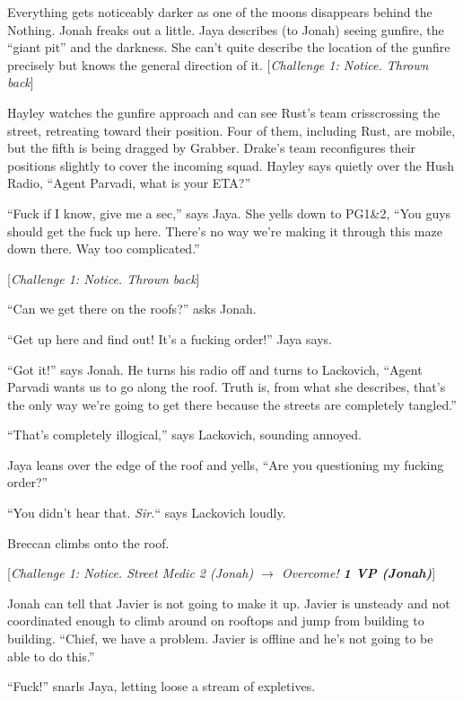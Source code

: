 Everything gets noticeably darker as one of the moons disappears behind the Nothing.  Jonah freaks out a little.  Jaya describes (to Jonah) seeing gunfire, the ``giant pit'' and the darkness.  She can't quite describe the location of the gunfire precisely but knows the general direction of it.  {[}\textit{Challenge 1: Notice.  Thrown back}{]}



Hayley watches the gunfire approach and can see Rust's team crisscrossing the street, retreating toward their position.  Four of them, including Rust, are mobile, but the fifth is being dragged by Grabber.  Drake's team reconfigures their positions slightly to cover the incoming squad.  Hayley says quietly over the Hush Radio, ``Agent Parvadi, what is your ETA?''

``Fuck if I know, give me a sec,'' says Jaya.  She yells down to PG1\&2, ``You guys should get the fuck up here.  There's no way we're making it through this maze down there.  Way too complicated.''

{[}\textit{Challenge 1: Notice.  Thrown back}{]}  

``Can we get there on the roofs?'' asks Jonah.

``Get up here and find out!  It's a fucking order!'' Jaya says.

``Got it!'' says Jonah.  He turns his radio off and turns to Lackovich, ``Agent Parvadi wants us to go along the roof.  Truth is, from what she describes, that's the only way we're going to get there because the streets are completely tangled.''

``That's completely illogical,'' says Lackovich, sounding annoyed.

Jaya leans over the edge of the roof and yells, ``Are you questioning my fucking order?''

``You didn't hear that.  \textit{Sir.}`` says Lackovich loudly.

Breccan climbs onto the roof.

{[}\textit{Challenge 1: Notice.  Street Medic 2 (Jonah) $\rightarrow$ Overcome! }\textit{\textbf{1 VP (Jonah)}}{]}

Jonah can tell that Javier is not going to make it up.  Javier is unsteady and not coordinated enough to climb around on rooftops and jump from building to building.  ``Chief, we have a problem.  Javier is offline and he's not going to be able to do this.''

``Fuck!'' snarls Jaya, letting loose a stream of expletives.

